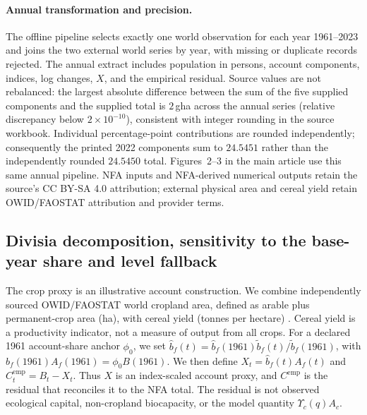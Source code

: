 \documentclass[11pt,a4paper]{article}
\newcommand{\Ups}{\Upsilon_c}
\begin{document}
\newpage
\paragraph{Annual transformation and precision.} The offline pipeline selects exactly one world observation for each year 1961--2023 and joins the two external world series by year, with missing or duplicate records rejected. The annual extract includes population in persons, account components, indices, log changes, $X$, and the empirical residual. Source values are not rebalanced: the largest absolute difference between the sum of the five supplied components and the supplied total is $2$\,gha across the annual series (relative discrepancy below $2\times10^{-10}$), consistent with integer rounding in the source workbook. Individual percentage-point contributions are rounded independently; consequently the printed 2022 components sum to $24.5451$ rather than the independently rounded $24.5450$ total. Figures~2--3 in the main article use this same annual pipeline. NFA inputs and NFA-derived numerical outputs retain the source's CC BY-SA 4.0 attribution; external physical area and cereal yield retain OWID/FAOSTAT attribution and provider terms.

\subsection{Divisia decomposition, sensitivity to the base-year share and level fallback}\label{si:divisia}

The crop proxy is an illustrative account construction. We combine independently sourced OWID/FAOSTAT world cropland area, defined as arable plus permanent-crop area (ha), with cereal yield (tonnes per hectare) \citep{OWIDCropland2026,OWIDCereal2026}. Cereal yield is a productivity indicator, not a measure of output from all crops. For a declared 1961 account-share anchor $\phi_0$, we set $\hat b_f(t)=\hat b_f(1961)\tilde b_f(t)/\tilde b_f(1961)$, with $\hat b_f(1961)A_f(1961)=\phi_0B(1961)$. We then define $X_t=\hat b_f(t)A_f(t)$ and $C^{\mathrm{emp}}_t=B_t-X_t$. Thus $X$ is an index-scaled account proxy, and $C^{\mathrm{emp}}$ is the residual that reconciles it to the NFA total. The residual is not observed ecological capital, non-cropland biocapacity, or the model quantity $\Ups(q)A_c$.
\end{document}
